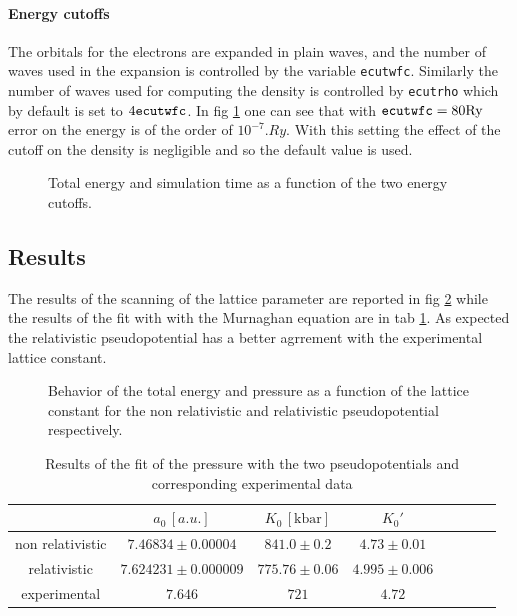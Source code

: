 \documentclass[a4paper, 11pt]{article}
\begin{document}
  \paragraph{Energy cutoffs}
    The orbitals for the electrons are expanded in plain waves, and the number of waves used in the expansion is controlled by the variable \verb|ecutwfc|. Similarly the number of waves used for computing the density is controlled by \verb|ecutrho| which by default is set to $4\verb|ecutwfc|$. In fig \ref{fig:bulk_ecut} one can see that with $ \verb|ecutwfc| = 80 \si{.Ry}$ error on the energy is of the order of $10^{-7} \si{.Ry}$. With this setting the effect of the cutoff on the density is negligible and so the default value is used.

    \begin{figure}[H]
      \centering
      \caption{Total energy and simulation time as a function of the two energy cutoffs.}
      \label{fig:bulk_ecut}
    \end{figure}

  \subsection{Results}
    The results of the scanning of the lattice parameter are reported in fig \ref{fig:bulk_a} while the results of the fit with with the Murnaghan equation are in tab \ref{tab:bulk_a}. As expected the relativistic pseudopotential has a better agrrement with the experimental lattice constant.

  \begin{figure}
    \centering
    \caption{Behavior of the total energy and pressure as a function of the lattice constant for the non relativistic and relativistic pseudopotential respectively.}
    \label{fig:bulk_a}
  \end{figure}

  \begin{table}
    \centering
    \begin{tabular}{cccccccc}
      \toprule
        & $a_0\, [a.u.]$ & $K_0\, [\si{\kilo\bar}]$ & $K_0'$ \\
      \midrule
      non relativistic & $7.46834 \pm 0.00004$ & $841.0 \pm 0.2$ & $4.73 \pm 0.01$ \\
      relativistic & $7.624231 \pm 0.000009$ & $775.76 \pm 0.06$ & $4.995 \pm 0.006$ \\
      \midrule
      experimental \cite{rif:bulk_exp_data} & $7.646$ & $721$ & $4.72$ \\
      \bottomrule
    \end{tabular}
    \caption{Results of the fit of the pressure with the two pseudopotentials and corresponding experimental data}
    \label{tab:bulk_a}
  \end{table}
\end{document}
